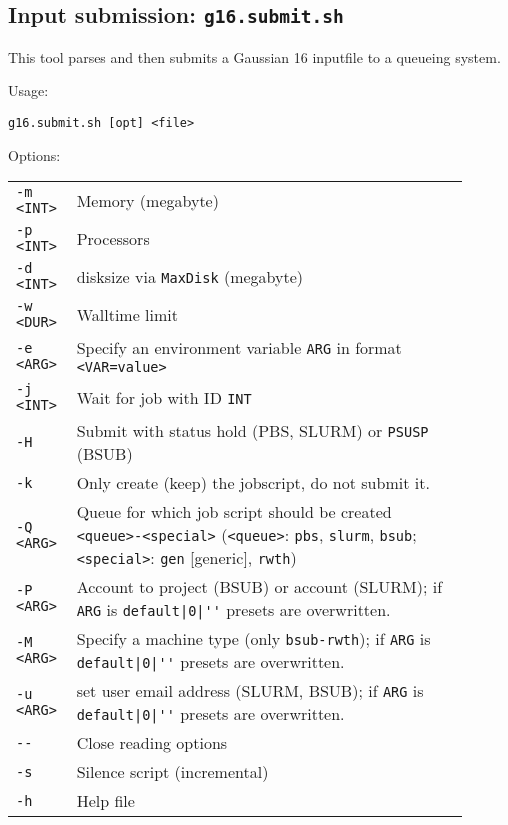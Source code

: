 \documentclass[   %
  final,          %
  a4paper         %
]{article}
\begin{document}
\subsection{Input submission: \texorpdfstring{{\lstinline`g16.submit.sh`}}{g16.submit.sh}}

This tool parses and then submits a Gaussian 16 inputfile to a queueing system.

Usage: 

\lstinline`g16.submit.sh [opt] <file>`

Options:

\begin{tabular}{p{0.1\linewidth}p{0.8\linewidth}}
  {\lstinline`-m <INT>`} & Memory (megabyte) \\
  {\lstinline`-p <INT>`} & Processors \\
  {\lstinline`-d <INT>`} & disksize via \texttt{MaxDisk} (megabyte) \\
  {\lstinline`-w <DUR>`} & Walltime limit \\
  {\lstinline`-e <ARG>`} & Specify an environment variable {\lstinline`ARG`} in format {\lstinline`<VAR=value>`} \\
  {\lstinline`-j <INT>`} & Wait for job with ID {\lstinline`INT`} \\
  {\lstinline`-H`}       & Submit with status hold (PBS, SLURM) or \texttt{PSUSP} (BSUB) \\
  {\lstinline`-k`}       & Only create (keep) the jobscript, do not submit it. \\
  {\lstinline`-Q <ARG>`} & Queue for which job script should be created {\lstinline`<queue>-<special>`} %
    ({\lstinline`<queue>`}: {\lstinline`pbs`}, {\lstinline`slurm`}, {\lstinline`bsub`}; %
     {\lstinline`<special>`}: {\lstinline`gen`} [generic], {\lstinline`rwth`}) \\
  {\lstinline`-P <ARG>`} & Account to project (BSUB) or account (SLURM); %
    if {\lstinline`ARG`} is {\lstinline`default|0|''`} presets are overwritten. \\
  {\lstinline`-M <ARG>`} & Specify a machine type (only \texttt{bsub-rwth}); %
    if {\lstinline`ARG`} is {\lstinline`default|0|''`} presets are overwritten. \\
  {\lstinline`-u <ARG>`} & set user email address (SLURM, BSUB); %
    if {\lstinline`ARG`} is {\lstinline`default|0|''`} presets are overwritten. \\
  {\lstinline`--`}       & Close reading options \\
  {\lstinline`-s`}       & Silence script (incremental) \\
  {\lstinline`-h`}       & Help file  \\
\end{tabular}
\end{document}
